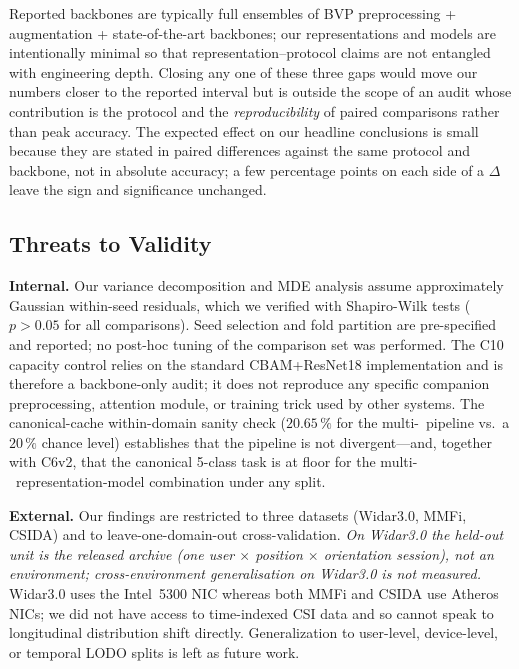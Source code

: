 \documentclass[11pt]{article}
\theoremstyle{definition}
\newcommand{\Rx}{\text{Rx}}
\begin{document}
Reported backbones are typically full ensembles of BVP preprocessing + augmentation + state-of-the-art backbones; our representations and models are intentionally minimal so that representation--protocol claims are not entangled with engineering depth. Closing any one of these three gaps would move our numbers closer to the reported interval but is outside the scope of an audit whose contribution is the protocol and the \emph{reproducibility} of paired comparisons rather than peak accuracy. The expected effect on our headline conclusions is small because they are stated in paired differences against the same protocol and backbone, not in absolute accuracy; a few percentage points on each side of a $\Delta$ leave the sign and significance unchanged.

\subsection{Threats to Validity}

\textbf{Internal.} Our variance decomposition and MDE analysis assume approximately Gaussian within-seed residuals, which we verified with Shapiro-Wilk tests ($p > 0.05$ for all comparisons). Seed selection and fold partition are pre-specified and reported; no post-hoc tuning of the comparison set was performed. The C10 capacity control relies on the standard CBAM+ResNet18 implementation and is therefore a backbone-only audit; it does not reproduce any specific companion preprocessing, attention module, or training trick used by other systems. The canonical-cache within-domain sanity check ($20.65\,\%$ for the multi-\Rx\ pipeline vs.\ a $20\,\%$ chance level) establishes that the pipeline is not divergent---and, together with C6v2, that the canonical 5-class task is at floor for the multi-\Rx\ representation-model combination under any split.

\textbf{External.} Our findings are restricted to three datasets (Widar3.0, MMFi, CSIDA) and to leave-one-domain-out cross-validation. \emph{On Widar3.0 the held-out unit is the released archive (one user $\times$ position $\times$ orientation session), not an environment; cross-environment generalisation on Widar3.0 is not measured.} Widar3.0 uses the Intel~5300 NIC whereas both MMFi and CSIDA use Atheros NICs; we did not have access to time-indexed CSI data and so cannot speak to longitudinal distribution shift directly. Generalization to user-level, device-level, or temporal LODO splits is left as future work.
\end{document}
